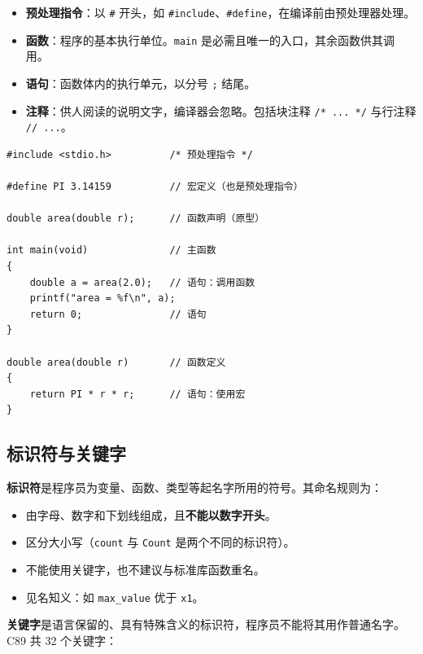 \begin{itemize}
    \item \textbf{预处理指令}：以 \texttt{\#} 开头，如 \texttt{\#include}、\texttt{\#define}，在编译前由预处理器处理。
    \item \textbf{函数}：程序的基本执行单位。\texttt{main} 是必需且唯一的入口，其余函数供其调用。
    \item \textbf{语句}：函数体内的执行单元，以分号 \texttt{;} 结尾。
    \item \textbf{注释}：供人阅读的说明文字，编译器会忽略。包括块注释 \texttt{/* ... */} 与行注释 \texttt{// ...}。
\end{itemize}

\begin{lstlisting}[caption={一个包含多种结构成分的程序}]
#include <stdio.h>          /* 预处理指令 */

#define PI 3.14159          // 宏定义（也是预处理指令）

double area(double r);      // 函数声明（原型）

int main(void)              // 主函数
{
    double a = area(2.0);   // 语句：调用函数
    printf("area = %f\n", a);
    return 0;               // 语句
}

double area(double r)       // 函数定义
{
    return PI * r * r;      // 语句：使用宏
}
\end{lstlisting}

\subsection{标识符与关键字}

\textbf{标识符}是程序员为变量、函数、类型等起名字所用的符号。其命名规则为：

\begin{itemize}
    \item 由字母、数字和下划线组成，且\textbf{不能以数字开头}。
    \item 区分大小写（\texttt{count} 与 \texttt{Count} 是两个不同的标识符）。
    \item 不能使用关键字，也不建议与标准库函数重名。
    \item 见名知义：如 \texttt{max\_value} 优于 \texttt{x1}。
\end{itemize}

\textbf{关键字}是语言保留的、具有特殊含义的标识符，程序员不能将其用作普通名字。C89 共 32 个关键字：

